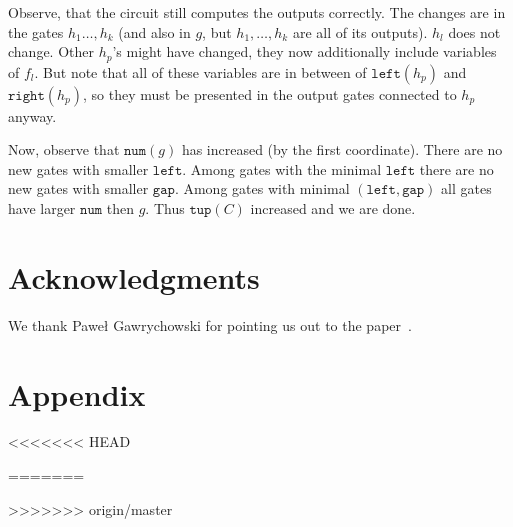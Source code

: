 \documentclass[11pt,letterpaper]{article}
\newcommand{\lef}{\texttt{left}}
\newcommand{\righ}{\texttt{right}}
\newcommand{\gap}{\texttt{gap}}
\newcommand{\num}{\texttt{num}}
\newcommand{\tup}{\texttt{tup}}
\begin{document}
Observe, that the circuit still computes the outputs correctly. The changes are in the gates $h_1\ldots, h_k$ (and also in $g$, but $h_1,\ldots, h_k$ are all of its outputs). $h_l$ does not change. Other $h_p$'s might have changed, they now additionally include variables of $f_l$. But note that all of these variables are in between of $\lef(h_p)$ and $\righ(h_p)$, so they must be presented in the output gates connected to $h_p$ anyway.

Now, observe that $\num(g)$ has increased (by the first coordinate). There are no new gates with smaller $\lef$. Among gates with the minimal $\lef$ there are no new gates with smaller $\gap$. Among gates with minimal $(\lef,\gap)$ all gates have larger $\num$ then $g$. Thus $\tup(C)$ increased and we are done.

\section{Acknowledgments}
We thank Paweł Gawrychowski for pointing us out to the paper~\cite{DBLP:journals/ijcga/ChazelleR91}.




\section{Appendix}


<<<<<<< HEAD


=======

>>>>>>> origin/master
\end{document}
